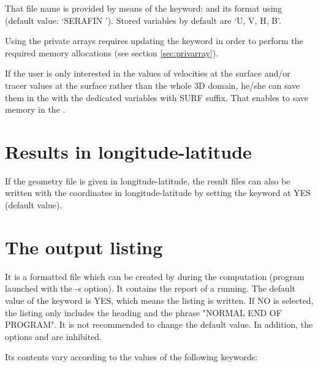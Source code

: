 That file name is provided by means of the keyword:  and
its format using  (default value: `SERAFIN ').
Stored variables by default are `U, V, H, B'.

Using the private arrays requires updating the keyword  in order to perform the required memory allocations (see
section \ref{sec:privarray}).

If the user is only interested in the values of velocities at the surface and/or
tracer values at the surface rather than the whole 3D domain,
he/she can save them in the  with the dedicated variables
with SURF suffix.
That enables to save memory in the .

\section{Results in longitude-latitude}
If the geometry file is given in longitude-latitude, the result files
can also be written with the coordinates in longitude-latitude
by setting the keyword 
at YES (default value).

\section{The output listing}

It is a formatted file which can be created by  during the
computation (program launched with the -s option). It contains the report of a
 running.
The default value of the keyword  is YES,
which means the listing is written.
If NO is selected, the listing only includes the heading and the
phrase "NORMAL END OF PROGRAM".
It is not recommended to change the default value.
In addition, the options  and  are inhibited.

Its contents vary according to the values of the following keywords:

